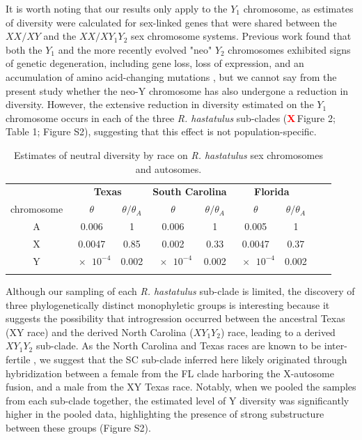 \documentclass[9pt,twocolumn,twoside]{gsajnl}
\newcommand{\X}{\textcolor{red}{\bf X\,}}
\begin{document}
It is worth noting that our results only apply to the $Y_{1}$ chromosome, as estimates of diversity were calculated for sex-linked genes that were shared between the $XX/XY$ and the $XX/XY_{1}Y_{2}$ sex chromosome systems. Previous work found that both the $Y_{1}$ and the more recently evolved "neo" $Y_{2}$ chromosomes exhibited signs of genetic degeneration, including gene loss, loss of expression, and an accumulation of amino acid-changing mutations \citep{hough2014}, but we cannot say from the present study whether the neo-Y chromosome has also undergone a reduction in diversity. However, the extensive reduction in diversity estimated on the $Y_{1}$ chromosome occurs in each of the three \textit{R. hastatulus} sub-clades (\X Figure 2; Table 1; Figure S2), suggesting that this effect is not population-specific.

\begin{table}[t!]
\centering
\caption{Estimates of neutral diversity by race on \textit{R. hastatulus} sex chromosomes and autosomes.}
\begin{tabular}{ccccccccc}
\textbf{} & \multicolumn{2}{c}{\textbf{Texas}} & \multicolumn{2}{c}{\textbf{South Carolina}} & \multicolumn{2}{c}{\textbf{Florida}} \\
chromosome & $\theta$ & $\theta/\theta_{A}$ & $\theta$ & $\theta/\theta_{A}$ & $\theta$ & $\theta/\theta_{A}$ \\
\midrule
A & 0.006 & 1 & 0.006 & 1 & 0.005 & 1 \\    
X & 0.0047 & 0.85 & 0.002 & 0.33 & 0.0047 & 0.37 \\ 
Y & $\num{e-4}$ & 0.002 & $\num{e-4}$ & 0.002 & $\num{e-4}$ & 0.002 \\ 
\addlinespace

\bottomrule
\end{tabular}
\end{table}

Although our sampling of each \textit{R. hastatulus} sub-clade is limited, the discovery of three phylogenetically distinct monophyletic groups is interesting because it suggests the possibility that introgression occurred between the ancestral Texas (XY race) and the derived North Carolina ($XY_{1}Y_{2}$) race, leading to a derived $XY_{1}Y_{2}$ sub-clade. As the North Carolina and Texas races are known to be inter-fertile \citep{smith1964evolving}, we suggest that the SC sub-clade inferred here likely originated through hybridization between a female from the FL clade harboring the X-autosome fusion, and a male from the XY Texas race. Notably, when we pooled the samples from each sub-clade together, the estimated level of Y diversity was significantly higher in the pooled data, highlighting the presence of strong substructure between these groups (Figure S2).
\end{document}
